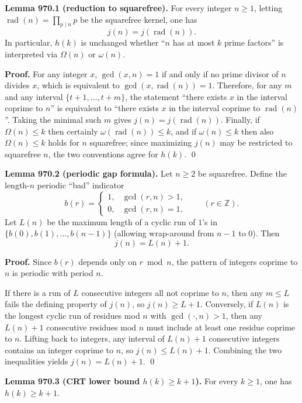 \medskip
\noindent\textbf{Lemma 970.1 (reduction to squarefree).}\label{lem:970-rad}
For every integer $n\ge 1$, letting $\operatorname{rad}(n)=\prod_{p\mid n}p$ be the squarefree kernel, one has
\[
 j(n)=j(\operatorname{rad}(n)).
\]
In particular, $h(k)$ is unchanged whether ``$n$ has at most $k$ prime factors'' is interpreted via $\Omega(n)$ or $\omega(n)$.

\noindent\textbf{Proof.}
For any integer $x$, $\gcd(x,n)=1$ if and only if no prime divisor of $n$ divides $x$, which is equivalent to $\gcd(x,\operatorname{rad}(n))=1$.
Therefore, for any $m$ and any interval $\{t+1,\dots,t+m\}$, the statement ``there exists $x$ in the interval coprime to $n$'' is equivalent to ``there exists $x$ in the interval coprime to $\operatorname{rad}(n)$''.  Taking the minimal such $m$ gives $j(n)=j(\operatorname{rad}(n))$.
Finally, if $\Omega(n)\le k$ then certainly $\omega(\operatorname{rad}(n))\le k$, and if $\omega(n)\le k$ then also $\Omega(n)\le k$ holds for $n$ squarefree; since maximizing $j(n)$ may be restricted to squarefree $n$, the two conventions agree for $h(k)$. \qed

\medskip
\noindent\textbf{Lemma 970.2 (periodic gap formula).}\label{lem:970-period}
Let $n\ge 2$ be squarefree.  Define the length-$n$ periodic ``bad'' indicator
\[
 b(r)=\begin{cases}1,&\gcd(r,n)>1,\\0,&\gcd(r,n)=1,\end{cases}\qquad (r\in\mathbb{Z}).
\]
Let $L(n)$ be the maximum length of a cyclic run of $1$'s in $\{b(0),b(1),\dots,b(n-1)\}$ (allowing wrap-around from $n-1$ to $0$).  Then
\[
 j(n)=L(n)+1.
\]

\noindent\textbf{Proof.}
Since $b(r)$ depends only on $r\bmod n$, the pattern of integers coprime to $n$ is periodic with period $n$.

If there is a run of $L$ consecutive integers all not coprime to $n$, then any $m\le L$ fails the defining property of $j(n)$, so $j(n)\ge L+1$.
Conversely, if $L(n)$ is the longest cyclic run of residues mod $n$ with $\gcd(\cdot,n)>1$, then any $L(n)+1$ consecutive residues mod $n$ must include at least one residue coprime to $n$.  Lifting back to integers, any interval of $L(n)+1$ consecutive integers contains an integer coprime to $n$, so $j(n)\le L(n)+1$.
Combining the two inequalities yields $j(n)=L(n)+1$. \qed

\medskip
\noindent\textbf{Lemma 970.3 (CRT lower bound $h(k)\ge k+1$).}\label{lem:970-crt-lower}
For every $k\ge 1$, one has $h(k)\ge k+1$.

